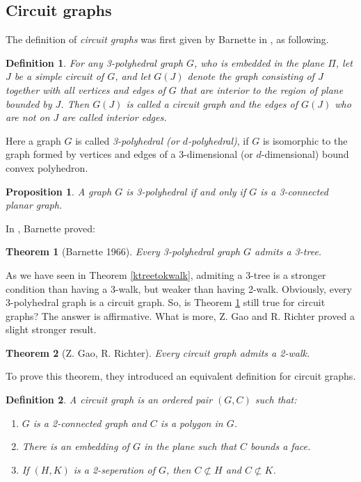 \documentclass[12pt]{report}
\newtheorem{theorem}{Theorem}
\newtheorem{definition}{Definition}
\newtheorem{proposition}{Proposition}
\begin{document}
\subsection{Circuit graphs}
The definition of {\em circuit graphs} was first given by Barnette in \cite{barnette1966trees}, as following.
\begin{definition}
For any 3-polyhedral graph $G$, who is embedded in the plane $\Pi$, let $J$ be a simple circuit of $G$, and let $G(J)$ denote the graph consisting of $J$ together with all vertices and edges of $G$ that are interior to the region of plane bounded by $J$. Then $G(J)$ is called a circuit graph and the edges of $G(J)$ who are not on $J$ are called interior edges.
\end{definition}
Here a graph $G$ is called {\em 3-polyhedral (or $d$-polyhedral)}, if $G$ is isomorphic to the graph formed by vertices and edges of a 3-dimensional (or $d$-dimensional) bound convex polyhedron.

\begin{proposition}
A graph $G$ is 3-polyhedral if and only if $G$ is a 3-connected planar graph.
\end{proposition}

In \cite{barnette1966trees}, Barnette proved:

\begin{theorem}[Barnette 1966]\label{3cp3tthm66}
Every 3-polyhedral graph $G$ admits a 3-tree.
\end{theorem}

As we have seen in Theorem \ref{ktreetokwalk}, admiting a 3-tree is a stronger condition than having a 3-walk, but weaker than having 2-walk.
Obviously, every 3-polyhedral graph is a circuit graph. So, is Theorem \ref{3cp3tthm66} still true for circuit graphs? The answer is affirmative. What is more, Z. Gao and R. Richter \cite{gao19942} proved a slight stronger result.

\begin{theorem}[Z. Gao, R. Richter]\label{2wincgthm941}
Every circuit graph admits a 2-walk.

\end{theorem}

To prove this theorem, they introduced an equivalent definition for circuit graphs.
\begin{definition}
A circuit graph is an ordered pair $(G,C)$ such that:
\begin{enumerate}
\item $G$ is a 2-connected graph and $C$ is a polygon in $G$.
\item There is an embedding of $G$ in the plane such that $C$ bounds a face.
\item If $(H,K)$ is a 2-seperation of $G$, then $C\not\subset H$ and $C\not\subset K$.
\end{enumerate}
\end{definition}
\end{document}
